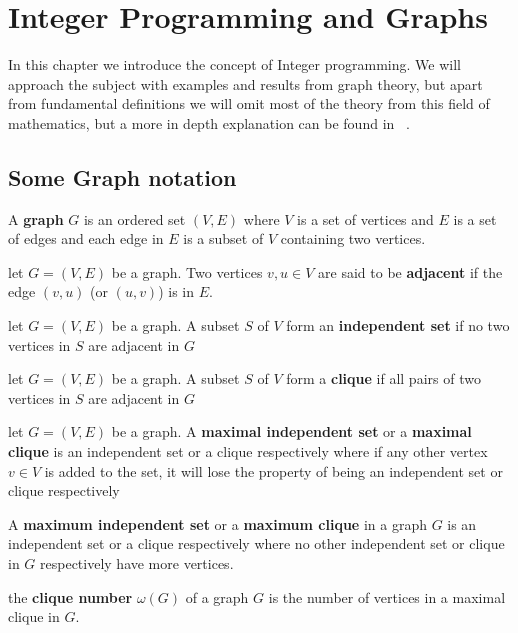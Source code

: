 \chapter{Integer Programming and Graphs}
In this chapter we introduce the concept of Integer programming. We will approach the subject with examples and results from graph theory, but apart from fundamental definitions we will omit most of the theory from this field of mathematics, but a more in depth explanation can be found in ~\cite{wolsey1998integer}. 
\section{Some Graph notation}
\begin{definition}\label{cromatic number}
A \textbf{graph} $G$ is an ordered set $(V,E)$ where $V$ is a set of vertices and $E$ is a set of edges and each edge in $E$ is a subset of $V$ containing two vertices.
\end{definition}
\begin{definition}
let $G=(V,E)$ be a graph. Two vertices $v,u\in V$ are said to be \textbf{adjacent} if the edge $(v,u)$ (or $(u,v)$) is in $E$.
\end{definition}
\begin{definition}
let $G=(V,E)$ be a graph. A subset $S$ of $V$ form an \textbf{independent set} if no two vertices in $S$ are adjacent in $G$
\end{definition}
\begin{definition}
let $G=(V,E)$ be a graph. A subset $S$ of $V$ form a \textbf{clique} if all pairs of two vertices in $S$ are adjacent in $G$
\end{definition}
\begin{definition}
let $G=(V,E)$ be a graph. A \textbf{maximal independent set} or a \textbf{maximal clique} is an independent set or a clique respectively where if any other vertex $v \in V$ is added to the set, it will lose the property of being an independent set or clique respectively 
\end{definition}
\begin{definition}
A \textbf{maximum independent set} or a \textbf{maximum clique} in a graph $G$ is an independent set or a clique respectively where no other independent set or clique in $G$ respectively have more vertices.
\end{definition}
\begin{definition}
the \textbf{clique number} $\omega(G)$ of a graph $G$ is the number of vertices in a maximal clique in $G$.
\end{definition}

